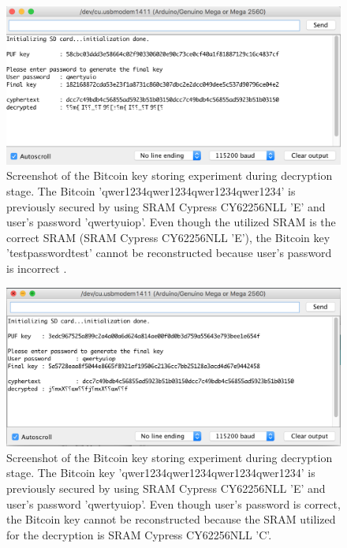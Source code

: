 \begin{figure}[tph!]
    \centerline{\includegraphics[width={\textwidth}]{images/E_decrypt_wrong_password}}
    \caption{Screenshot of the Bitcoin key storing experiment during decryption stage. The Bitcoin 'qwer1234qwer1234qwer1234qwer1234' is previously secured by using SRAM Cypress CY62256NLL 'E' and user's password 'qwertyuiop'.
    Even though the utilized SRAM is the correct SRAM (SRAM Cypress CY62256NLL 'E'), the Bitcoin key 'testpasswordtest' cannot be reconstructed because user's password is incorrect .}
    \label{fig:E_decrypt_wrong_password}
\end{figure}

\begin{figure}[tph!]
    \centerline{\includegraphics[width={\textwidth}]{images/E_decrypt_wrong_SRAM}}
    \caption{Screenshot of the Bitcoin key storing experiment during decryption stage. The Bitcoin key 'qwer1234qwer1234qwer1234qwer1234' is previously secured by using SRAM Cypress CY62256NLL 'E' and user's password 'qwertyuiop'.
    Even though user's password is correct, the Bitcoin key cannot be reconstructed because the SRAM utilized for the decryption is SRAM Cypress CY62256NLL 'C'.}
    \label{fig:E_decrypt_wrong_SRAM}
\end{figure}
